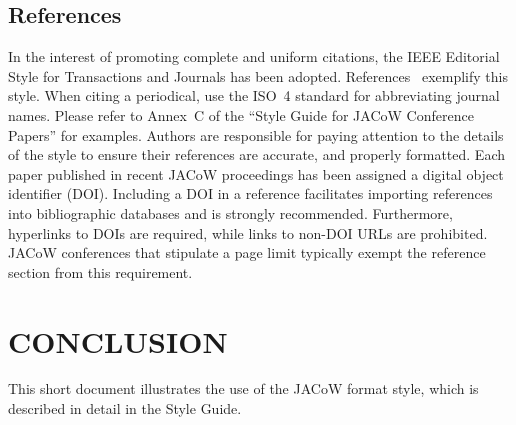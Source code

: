 \documentclass[%
               biblatex,     %
               ]{jacow}
\begin{document}
\subsection{References}

In the interest of promoting complete and uniform citations, 
the IEEE Editorial Style for Transactions and Journals has been adopted. 
References~\cite{ref:jacow-paper, ref:journal-paper} exemplify this style. 
When citing a periodical, use the ISO~4 standard for abbreviating journal names. 
Please refer to Annex~C of the “Style Guide for JACoW Conference Papers” for examples. 
Authors are responsible for paying attention to the details of the style to ensure their references are 
accurate, and properly formatted. 
Each paper published in recent JACoW proceedings has been assigned a digital object identifier (DOI). Including a DOI in a reference facilitates importing references into bibliographic databases and is strongly recommended. 
Furthermore, hyperlinks to DOIs are required, while links to non-DOI URLs are prohibited. 
JACoW conferences that stipulate a page limit typically exempt the reference section from this requirement.

\section{CONCLUSION}

This short document illustrates the use of the JACoW format style, which is described in detail in the Style Guide. 

\printbibliography
\end{document}
